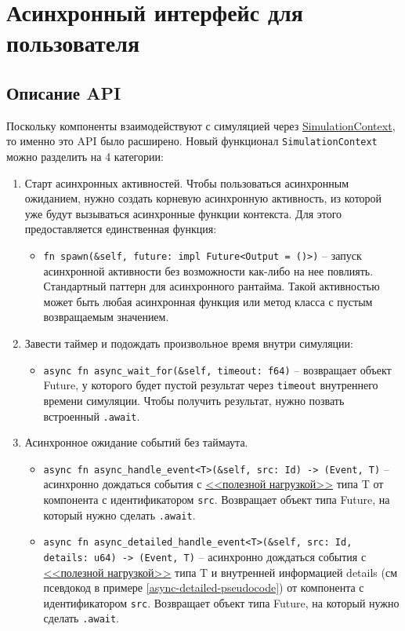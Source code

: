 \section{Асинхронный интерфейс для пользователя} \label{interface}

\subsection{Описание API}

Поскольку компоненты взаимодействуют с симуляцией через \hyperref[SimulationContext]{SimulationContext}, то именно это API было расширено. Новый функционал \texttt{SimulationContext} можно разделить на 4 категории: 
\begin{enumerate}
    \item Старт асинхронных активностей. Чтобы пользоваться асинхронным ожиданием, нужно создать корневую асинхронную активность, из которой уже будут вызываться асинхронные функции контекста. Для этого предоставляется единственная функция: 
    \begin{itemize}
        \item \texttt{fn spawn(\&self, future: impl Future<Output = ()>)} -- запуск асинхронной активности без возможности как-либо на нее повлиять. Стандартный паттерн для асинхронного рантайма. Такой активностью может быть любая асинхронная функция или метод класса с пустым возвращаемым значением. \label{spawn}
    \end{itemize}
    \item Завести таймер и подождать произвольное время внутри симуляции: 
    \begin{itemize}
        \item \texttt{async fn async\_wait\_for(\&self, timeout: f64)} -- возвращает объект Future, у которого будет пустой результат через \texttt{timeout} внутреннего времени симуляции. Чтобы получить результат, нужно позвать встроенный \texttt{.await}.
    \end{itemize}
    \item Асинхронное ожидание событий без таймаута. 
    \begin{itemize}
        \item \texttt{async fn async\_handle\_event<T>(\&self, src: Id) -> (Event, T)} -- асинхронно дождаться события с \hyperref[Event:payload]{<<полезной нагрузкой>>} типа T от компонента с идентификатором \texttt{src}. Возвращает объект типа Future, на который нужно сделать \texttt{.await}.
        \item \texttt{async fn async\_detailed\_handle\_event<T>(\&self, src: Id, details: u64) -> (Event, T)} -- асинхронно дождаться события с \hyperref[Event:payload]{<<полезной нагрузкой>>} типа T и внутренней информацией details (см псевдокод в примере \ref{async-detailed-pseudocode}) от компонента с идентификатором \texttt{src}. Возвращает объект типа Future, на который нужно сделать \texttt{.await}.

\end{itemize}
\end{enumerate}

